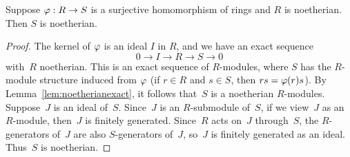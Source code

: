 \begin{lemma}\label{lem:surjnoetherian}
Suppose $\varphi:R\to S$ is a surjective homomorphism of rings 
and $R$ is noetherian.   Then $S$ is noetherian.
\end{lemma}
\begin{proof}
The kernel of $\varphi$ is an ideal $I$ in $R$, and
we have an exact sequence 
$$ 
  0 \to I \to R \to S \to 0
$$
with~$R$ noetherian.  
This is an exact sequence of $R$-modules, where $S$ has the
$R$-module structure induced from $\varphi$ (if $r\in R$
and $s\in S$, then $rs = \varphi(r)s$).
By Lemma~\ref{lem:noetherianexact}, it follows
that~$S$ is a noetherian $R$-modules.  Suppose~$J$ is an ideal of~$S$.
Since~$J$ is an $R$-submodule of~$S$, if we view~$J$ as an $R$-module,
then~$J$ is finitely generated.  Since~$R$ acts on~$J$ through~$S$,
the $R$-generators of~$J$ are also $S$-generators of~$J$, so~$J$ 
is finitely generated as an ideal.  Thus~$S$ is noetherian.
\end{proof}

